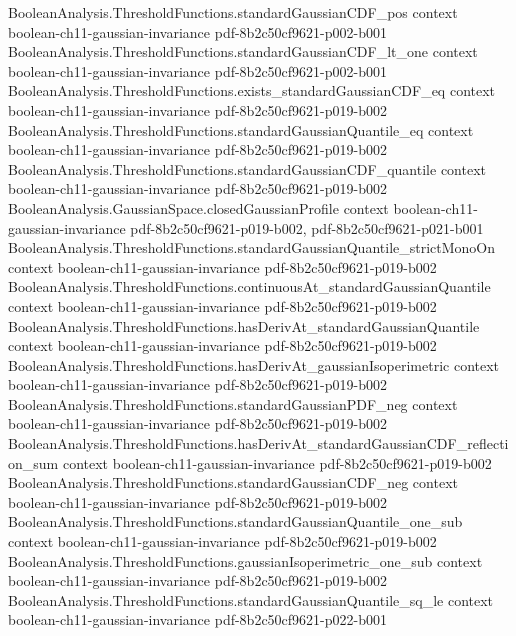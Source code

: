 \begin{lemma}
\proofstep
  {BooleanAnalysis.ThresholdFunctions.standardGaussianCDF_pos}
  {context}
  {boolean-ch11-gaussian-invariance}
  {pdf-8b2c50cf9621-p002-b001}
\proofstep
  {BooleanAnalysis.ThresholdFunctions.standardGaussianCDF_lt_one}
  {context}
  {boolean-ch11-gaussian-invariance}
  {pdf-8b2c50cf9621-p002-b001}
\proofstep
  {BooleanAnalysis.ThresholdFunctions.exists_standardGaussianCDF_eq}
  {context}
  {boolean-ch11-gaussian-invariance}
  {pdf-8b2c50cf9621-p019-b002}
\proofstep
  {BooleanAnalysis.ThresholdFunctions.standardGaussianQuantile_eq}
  {context}
  {boolean-ch11-gaussian-invariance}
  {pdf-8b2c50cf9621-p019-b002}
\proofstep
  {BooleanAnalysis.ThresholdFunctions.standardGaussianCDF_quantile}
  {context}
  {boolean-ch11-gaussian-invariance}
  {pdf-8b2c50cf9621-p019-b002}
\proofstep
  {BooleanAnalysis.GaussianSpace.closedGaussianProfile}
  {context}
  {boolean-ch11-gaussian-invariance}
  {pdf-8b2c50cf9621-p019-b002,
    pdf-8b2c50cf9621-p021-b001}
\proofstep
  {BooleanAnalysis.ThresholdFunctions.standardGaussianQuantile_strictMonoOn}
  {context}
  {boolean-ch11-gaussian-invariance}
  {pdf-8b2c50cf9621-p019-b002}
\proofstep
  {BooleanAnalysis.ThresholdFunctions.continuousAt_standardGaussianQuantile}
  {context}
  {boolean-ch11-gaussian-invariance}
  {pdf-8b2c50cf9621-p019-b002}
\proofstep
  {BooleanAnalysis.ThresholdFunctions.hasDerivAt_standardGaussianQuantile}
  {context}
  {boolean-ch11-gaussian-invariance}
  {pdf-8b2c50cf9621-p019-b002}
\proofstep
  {BooleanAnalysis.ThresholdFunctions.hasDerivAt_gaussianIsoperimetric}
  {context}
  {boolean-ch11-gaussian-invariance}
  {pdf-8b2c50cf9621-p019-b002}
\proofstep
  {BooleanAnalysis.ThresholdFunctions.standardGaussianPDF_neg}
  {context}
  {boolean-ch11-gaussian-invariance}
  {pdf-8b2c50cf9621-p019-b002}
\proofstep
  {BooleanAnalysis.ThresholdFunctions.hasDerivAt_standardGaussianCDF_reflection_sum}
  {context}
  {boolean-ch11-gaussian-invariance}
  {pdf-8b2c50cf9621-p019-b002}
\proofstep
  {BooleanAnalysis.ThresholdFunctions.standardGaussianCDF_neg}
  {context}
  {boolean-ch11-gaussian-invariance}
  {pdf-8b2c50cf9621-p019-b002}
\proofstep
  {BooleanAnalysis.ThresholdFunctions.standardGaussianQuantile_one_sub}
  {context}
  {boolean-ch11-gaussian-invariance}
  {pdf-8b2c50cf9621-p019-b002}
\proofstep
  {BooleanAnalysis.ThresholdFunctions.gaussianIsoperimetric_one_sub}
  {context}
  {boolean-ch11-gaussian-invariance}
  {pdf-8b2c50cf9621-p019-b002}
\proofstep
  {BooleanAnalysis.ThresholdFunctions.standardGaussianQuantile_sq_le}
  {context}
  {boolean-ch11-gaussian-invariance}
  {pdf-8b2c50cf9621-p022-b001}

\end{lemma}
